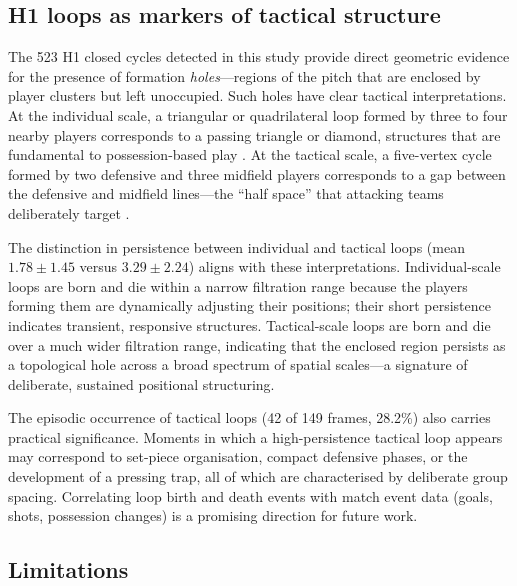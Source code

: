 \documentclass[11pt,a4paper]{article}
\begin{document}
\subsection{H1 loops as markers of tactical structure}

The 523 H1 closed cycles detected in this study provide
direct geometric evidence for the presence of formation
\emph{holes}---regions of the pitch that are enclosed by
player clusters but left unoccupied.  Such holes have clear
tactical interpretations.  At the individual scale, a
triangular or quadrilateral loop formed by three to four
nearby players corresponds to a passing triangle or
diamond, structures that are fundamental to possession-based
play \citep{Buldu2019}.  At the tactical scale, a five-vertex
cycle formed by two defensive and three midfield players
corresponds to a gap between the defensive and midfield
lines---the ``half space'' that attacking teams deliberately
target \citep{Memmert2017}.

The distinction in persistence between individual and
tactical loops (mean \(1.78 \pm 1.45\) versus
\(3.29 \pm 2.24\)) aligns with these interpretations.
Individual-scale loops are born and die within a narrow
filtration range because the players forming them are
dynamically adjusting their positions; their short
persistence indicates transient, responsive structures.
Tactical-scale loops are born and die over a much wider
filtration range, indicating that the enclosed region
persists as a topological hole across a broad spectrum of
spatial scales---a signature of deliberate, sustained
positional structuring.

The episodic occurrence of tactical loops (42 of 149 frames,
28.2\%) also carries practical significance.  Moments in
which a high-persistence tactical loop appears may
correspond to set-piece organisation, compact defensive
phases, or the development of a pressing trap, all of
which are characterised by deliberate group spacing.
Correlating loop birth and death events with match
event data (goals, shots, possession changes) is a
promising direction for future work.

\subsection{Limitations}
\end{document}
